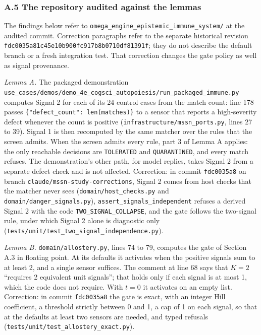 \documentclass[
  11pt,
]{article}
\newcommand{\passthrough}[1]{#1}
\begin{document}
\hypertarget{a.5-the-repository-audited-against-the-lemmas}{%
\subsubsection{A.5 The repository audited against the
lemmas}\label{a.5-the-repository-audited-against-the-lemmas}}

The findings below refer to
\texttt{\nolinkurl{omega_engine_epistemic_immune_system/}} at
the audited commit. Correction paragraphs refer to the separate
historical revision
\texttt{\nolinkurl{fdc0035a81c45e10b900fc917b8b0710df81391f}}; they
do not describe the default branch or a fresh integration test. That
correction changes the gate policy as well as signal provenance.

\emph{Lemma A.} The packaged demonstration
\texttt{\nolinkurl{use_cases/demos/demo_4e_cogsci_autopoiesis/run_packaged_immune.py}}
computes Signal 2 for each of its 24 control cases from the match count:
line 178 passes
\texttt{\{"defect\_count": len(matches)\}} to a sensor
that reports a high-severity defect whenever the count is positive
(\texttt{\nolinkurl{infrastructure/mssn_ports.py}}, lines 27 to
39). Signal 1 is then recomputed by the same matcher over the rules that
the screen admits. When the screen admits every rule, part 3 of Lemma A
applies: the only reachable decisions are
\passthrough{\lstinline!TOLERATED!} and
\passthrough{\lstinline!QUARANTINED!}, and every match refuses. The
demonstration's other path, for model replies, takes Signal 2 from a
separate defect check and is not affected. Correction: in commit
\passthrough{\lstinline!fdc0035a8!} on branch
\texttt{\nolinkurl{claude/mssn-study-corrections}}, Signal 2 comes
from host checks that the matcher never sees
(\texttt{\nolinkurl{domain/host_checks.py}} and
\texttt{\nolinkurl{domain/danger_signals.py}}),
\texttt{\nolinkurl{assert_signals_independent}} refuses a derived
Signal 2 with the code \texttt{\nolinkurl{TWO_SIGNAL_COLLAPSE}},
and the gate follows the two-signal rule, under which Signal 2 alone is
diagnostic only
(\texttt{\nolinkurl{tests/unit/test_two_signal_independence.py}}).

\emph{Lemma B.} \texttt{\nolinkurl{domain/allostery.py}}, lines 74
to 79, computes the gate of Section A.3 in floating point. At its
defaults it activates when the positive signals sum to at least 2, and a
single sensor suffices. The comment at line 68 says that \(K = 2\)
``requires 2 equivalent unit signals''; that holds only if each signal
is at most 1, which the code does not require. With \(t = 0\) it
activates on an empty list. Correction: in commit
\passthrough{\lstinline!fdc0035a8!} the gate is exact, with an integer
Hill coefficient, a threshold strictly between 0 and 1, a cap of 1 on
each signal, so that at the defaults at least two sensors are needed,
and typed refusals
(\texttt{\nolinkurl{tests/unit/test_allostery_exact.py}}).
\end{document}
